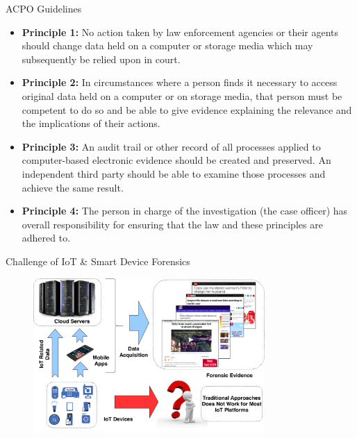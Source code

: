 \documentclass[handout]{beamer}
\begin{document}
\begin{frame}{ACPO Guidelines}

\begin{itemize}
\footnotesize

\item \textbf{Principle 1:} No action taken by law enforcement agencies or their agents should change data held on a computer or storage media which may subsequently be relied upon in court.
\vspace{10pt}

\item \textbf{Principle 2:} In circumstances where a person finds it necessary to access original data held on a computer or on storage media, that person must be competent to do so and be able to give evidence explaining the relevance and the implications of their actions.
\vspace{10pt}

\item \textbf{Principle 3:} An audit trail or other record of all processes applied to computer-based electronic evidence should be created and preserved. An independent third party should be able to examine those processes and achieve the same result.
\vspace{10pt}

\item \textbf{Principle 4:} The person in charge of the investigation (the case officer) has overall responsibility for ensuring that the law and these principles are adhered to.

\end{itemize}

\end{frame}



\begin{frame}{Challenge of IoT \& Smart Device Forensics}  

	\begin{figure}
		\includegraphics[width=250pt]{figures/IoT-forensic-challenge-small.png}
	\end{figure}

\end{frame}
\end{document}
